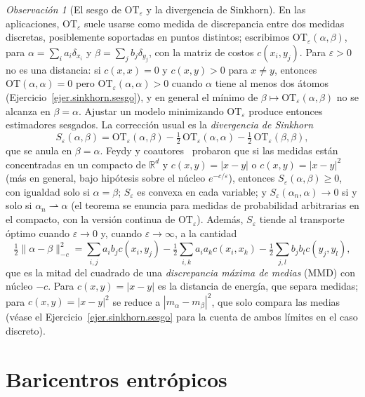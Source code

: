 \documentclass[12pt, a4paper]{amsbook}
\newcommand{\R}{{\mathbb R}}
\theoremstyle{remark}
\newtheorem{obs}[teo]{Observación}
\theoremstyle{definition}
\numberwithin{section}{chapter}
\numberwithin{subsection}{section}
\numberwithin{equation}{section}
\numberwithin{figure}{chapter}
\begin{document}
\begin{obs}[El sesgo de $\mathrm{OT}_\varepsilon$ y la divergencia de
Sinkhorn]\label{obs.divergencia.sinkhorn}
En las aplicaciones, $\mathrm{OT}_\varepsilon$ suele usarse como medida de
discrepancia entre dos medidas discretas, posiblemente soportadas en puntos
distintos; escribimos $\mathrm{OT}_\varepsilon(\alpha,\beta)$, para
$\alpha=\sum_ia_i\delta_{x_i}$ y $\beta=\sum_jb_j\delta_{y_j}$, con la
matriz de costos $c(x_i,y_j)$. Para $\varepsilon>0$ no es una distancia: si
$c(x,x)=0$ y $c(x,y)>0$ para $x\ne y$, entonces $\mathrm{OT}(\alpha,\alpha)=0$
pero $\mathrm{OT}_\varepsilon(\alpha,\alpha)>0$ cuando $\alpha$ tiene al menos
dos átomos (Ejercicio~\ref{ejer.sinkhorn.sesgo}), y en general el mínimo de
$\beta\mapsto\mathrm{OT}_\varepsilon(\alpha,\beta)$ no se alcanza en
$\beta=\alpha$. Ajustar un modelo minimizando $\mathrm{OT}_\varepsilon$
produce entonces estimadores sesgados. La corrección usual es la
\emph{divergencia de Sinkhorn}~\cite{GenevayPeyreCuturi2018,Feydy2019}
\[
S_\varepsilon(\alpha,\beta)
=\mathrm{OT}_\varepsilon(\alpha,\beta)
-\tfrac12\,\mathrm{OT}_\varepsilon(\alpha,\alpha)
-\tfrac12\,\mathrm{OT}_\varepsilon(\beta,\beta),
\]
que se anula en $\beta=\alpha$. Feydy y
coautores~\cite[Theorem~1]{Feydy2019} probaron que si las medidas están
concentradas en un compacto de $\R^d$ y $c(x,y)=|x-y|$ o $c(x,y)=|x-y|^2$
(más en general, bajo hipótesis sobre el núcleo $e^{-c/\varepsilon}$), entonces
$S_\varepsilon(\alpha,\beta)\ge0$, con igualdad solo si $\alpha=\beta$;
$S_\varepsilon$ es convexa en cada variable; y $S_\varepsilon(\alpha_n,\alpha)\to0$
si y solo si $\alpha_n\rightharpoonup\alpha$ (el teorema se enuncia para
medidas de probabilidad arbitrarias en el compacto, con la versión continua
de $\mathrm{OT}_\varepsilon$). Además, $S_\varepsilon$ tiende al transporte
óptimo cuando $\varepsilon\to0$ y, cuando $\varepsilon\to\infty$, a la cantidad
\[
\tfrac12\|\alpha-\beta\|_{-c}^2=\sum_{i,j}a_ib_jc(x_i,y_j)
-\tfrac12\sum_{i,k}a_ia_kc(x_i,x_k)-\tfrac12\sum_{j,l}b_jb_lc(y_j,y_l),
\]
que es la mitad del cuadrado de una \emph{discrepancia máxima de medias}
(MMD) con núcleo $-c$. Para $c(x,y)=|x-y|$ es la distancia de energía, que
separa medidas; para $c(x,y)=|x-y|^2$ se reduce a $|m_\alpha-m_\beta|^2$, que
solo compara las medias (véase el Ejercicio~\ref{ejer.sinkhorn.sesgo} para la
cuenta de ambos límites en el caso discreto).
\end{obs}

\section{Baricentros entrópicos}\label{sec.baricentros.entropicos}
\end{document}
